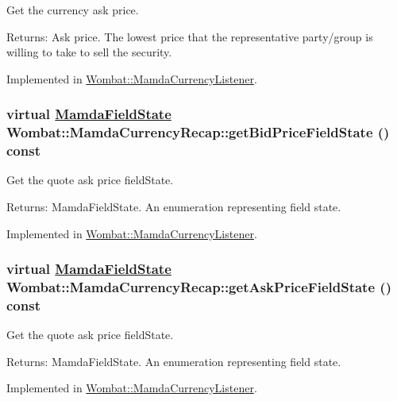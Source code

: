 Get the currency ask price. 

\begin{Desc}
\item[Returns:]Ask price. The lowest price that the representative party/group is willing to take to sell the security. \end{Desc}


Implemented in \hyperlink{classWombat_1_1MamdaCurrencyListener_7e0b54e9607f5e4770ab22d2da0c63fe}{Wombat::Mamda\-Currency\-Listener}.\hypertarget{classWombat_1_1MamdaCurrencyRecap_402c9cbe8f4b3a19f0cd579cb5871b5b}{
\subsubsection[getBidPriceFieldState]{\setlength{\rightskip}{0pt plus 5cm}virtual \hyperlink{namespaceWombat_93aac974f2ab713554fd12a1fa3b7d2a}{Mamda\-Field\-State} Wombat::Mamda\-Currency\-Recap::get\-Bid\-Price\-Field\-State () const}}
\label{classWombat_1_1MamdaCurrencyRecap_402c9cbe8f4b3a19f0cd579cb5871b5b}


Get the quote ask price field\-State. 

\begin{Desc}
\item[Returns:]Mamda\-Field\-State. An enumeration representing field state. \end{Desc}


Implemented in \hyperlink{classWombat_1_1MamdaCurrencyListener_5db8b40b06fe6b4fb3fa1e388502a8c2}{Wombat::Mamda\-Currency\-Listener}.\hypertarget{classWombat_1_1MamdaCurrencyRecap_9c164af05a5d96f69f20dfdfd46d2211}{
\subsubsection[getAskPriceFieldState]{\setlength{\rightskip}{0pt plus 5cm}virtual \hyperlink{namespaceWombat_93aac974f2ab713554fd12a1fa3b7d2a}{Mamda\-Field\-State} Wombat::Mamda\-Currency\-Recap::get\-Ask\-Price\-Field\-State () const}}
\label{classWombat_1_1MamdaCurrencyRecap_9c164af05a5d96f69f20dfdfd46d2211}


Get the quote ask price field\-State. 

\begin{Desc}
\item[Returns:]Mamda\-Field\-State. An enumeration representing field state. \end{Desc}


Implemented in \hyperlink{classWombat_1_1MamdaCurrencyListener_485502d95a2b9f71119353b736719d57}{Wombat::Mamda\-Currency\-Listener}.